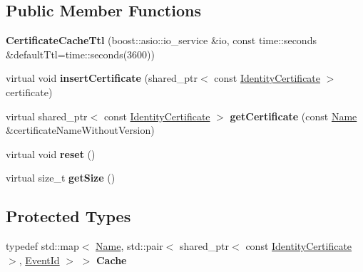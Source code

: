 \subsection*{Public Member Functions}
\begin{DoxyCompactItemize}
\item 
{\bfseries Certificate\+Cache\+Ttl} (boost\+::asio\+::io\+\_\+service \&io, const time\+::seconds \&default\+Ttl=time\+::seconds(3600))\hypertarget{classndn_1_1CertificateCacheTtl_a25c6324e536c70d62da94799d398346e}{}\label{classndn_1_1CertificateCacheTtl_a25c6324e536c70d62da94799d398346e}

\item 
virtual void {\bfseries insert\+Certificate} (shared\+\_\+ptr$<$ const \hyperlink{classndn_1_1IdentityCertificate}{Identity\+Certificate} $>$ certificate)\hypertarget{classndn_1_1CertificateCacheTtl_acc2c946611ece657d702dcd01135e5f1}{}\label{classndn_1_1CertificateCacheTtl_acc2c946611ece657d702dcd01135e5f1}

\item 
virtual shared\+\_\+ptr$<$ const \hyperlink{classndn_1_1IdentityCertificate}{Identity\+Certificate} $>$ {\bfseries get\+Certificate} (const \hyperlink{classndn_1_1Name}{Name} \&certificate\+Name\+Without\+Version)\hypertarget{classndn_1_1CertificateCacheTtl_aa5c6f80d9282f8578b4802fb819aa080}{}\label{classndn_1_1CertificateCacheTtl_aa5c6f80d9282f8578b4802fb819aa080}

\item 
virtual void {\bfseries reset} ()\hypertarget{classndn_1_1CertificateCacheTtl_aa4c12060eb3a83f6f41c11d69db83258}{}\label{classndn_1_1CertificateCacheTtl_aa4c12060eb3a83f6f41c11d69db83258}

\item 
virtual size\+\_\+t {\bfseries get\+Size} ()\hypertarget{classndn_1_1CertificateCacheTtl_a436571484990512c679472a31915c64b}{}\label{classndn_1_1CertificateCacheTtl_a436571484990512c679472a31915c64b}

\end{DoxyCompactItemize}
\subsection*{Protected Types}
\begin{DoxyCompactItemize}
\item 
typedef std\+::map$<$ \hyperlink{classndn_1_1Name}{Name}, std\+::pair$<$ shared\+\_\+ptr$<$ const \hyperlink{classndn_1_1IdentityCertificate}{Identity\+Certificate} $>$, \hyperlink{classEventId}{Event\+Id} $>$ $>$ {\bfseries Cache}\hypertarget{classndn_1_1CertificateCacheTtl_a4737918345b93dc5fe600d53eff0c444}{}\label{classndn_1_1CertificateCacheTtl_a4737918345b93dc5fe600d53eff0c444}

\end{DoxyCompactItemize}

